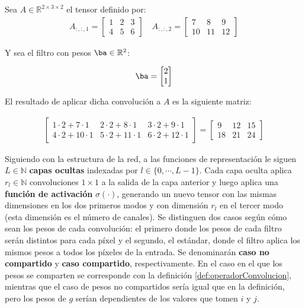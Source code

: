 \begin{ejemplo}
Sea $A\in\mathbb{R}^{2\times 3 \times 2}$ el tensor definido por:
\begin{align*}
A_{:,:,1} = \begin{bmatrix}
1 & 2 & 3 \\
4 & 5 & 6 
\end{bmatrix} \quad
A_{:,:,2} = \begin{bmatrix}
7 & 8 & 9 \\
10 & 11 & 12 
\end{bmatrix}
\end{align*}

Y sea el filtro con pesos $\ba\in\mathbb{R}^2$:

\begin{align*}
\ba = \begin{bmatrix}
2 \\
1 \\
\end{bmatrix}
\end{align*}

El resultado de aplicar dicha convolución a $A$ es la siguiente matriz:

\begin{align*}
\begin{bmatrix}
1\cdot 2 + 7\cdot 1 & 2\cdot 2 + 8\cdot 1 & 3\cdot 2 + 9\cdot 1 \\
4\cdot 2 + 10\cdot 1 & 5\cdot 2 + 11\cdot 1 & 6\cdot 2 + 12\cdot 1
\end{bmatrix}
=
\begin{bmatrix}
9 & 12 & 15\\
18 & 21 & 24
\end{bmatrix}
\end{align*}
\end{ejemplo}


Siguiendo con la estructura de la red, a las funciones de representación le siguen $L\in\mathbb{N}$ \textbf{capas ocultas} indexadas por $l\in\{0,\cdots ,L-1\}$. Cada capa oculta aplica $r_l\in\mathbb{N}$ convoluciones $1\times1$ a la salida de la capa anterior y luego aplica una \textbf{función de activación} $\sigma(\cdot)$, generando un nuevo tensor con las mismas dimensiones en los dos primeros modos y con dimensión $r_l$ en el tercer modo (esta dimensión es el número de canales). Se distinguen dos casos según cómo sean los pesos de cada convolución: el primero donde los pesos de cada filtro serán distintos para cada píxel y el segundo, el estándar, donde el filtro aplica los mismos pesos a todos los píxeles de la entrada. Se denominarán \textbf{caso no compartido} y \textbf{caso compartido}, respectivamente. En el caso en el que los pesos se comparten se corresponde con la definición \ref{def:operadorConvolucion}, mientras que el caso de pesos no compartidos sería igual que en la definición, pero los pesos de $g$ serían dependientes de los valores que tomen $i$ y $j$.


